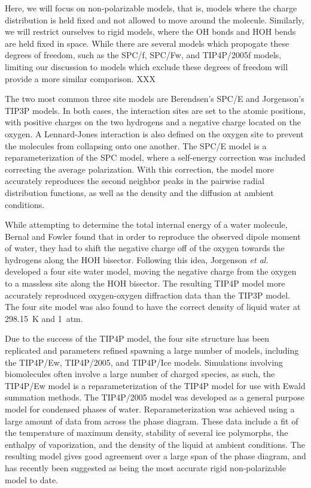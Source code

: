 Here, we will focus on non-polarizable models, that is, models where
the charge distribution is held fixed and not allowed to move around
the molecule. Similarly, we will restrict ourselves to rigid models,
where the OH bonds and HOH bends are held fixed in space. While there
are several models which propogate these degrees of freedom, such as
the SPC/f\cite{Ferguson1995}, SPC/Fw\cite{Wu2006}, and
TIP4P/2005f\cite{Gonzalez2011} models, limiting our discussion to
models which exclude these degrees of freedom will provide a more
similar comparison. XXX

The two most common three site models are Berendsen's
SPC/E\cite{Berendsen1987} and Jorgenson's TIP3P\cite{Jorgenson1983}
models. In both cases, the interaction sites are set to the atomic
positions, with positive charges on the two hydrogens and a negative
charge located on the oxygen. A Lennard-Jones interaction is also
defined on the oxygen site to prevent the molecules from collapsing
onto one another. The SPC/E model is a reparameterization of the
SPC\cite{Berendsen1981} model, where a self-energy correction was
included correcting the average polarization. With this correction,
the model more accurately reproduces the second neighbor peaks in the
pairwise radial distribution functions, as well as the density and the
diffusion at ambient conditions.\cite{Berendsen1987}

While attempting to determine the total internal energy of a water
molecule, Bernal and Fowler found that in order to reproduce the
observed dipole moment of water, they had to shift the negative charge
off of the oxygen towards the hydrogens along the HOH
bisector.\cite{Bernal1993} Following this idea, Jorgenson \textit{et
  al.} developed a four site water model, moving the negative charge
from the oxygen to a massless site along the HOH bisector. The
resulting TIP4P model more accurately reproduced oxygen-oxygen
diffraction data than the TIP3P model.\cite{Jorgenson1983} The four
site model was also found to have the correct density of liquid water
at 298.15~K and 1~atm. 

Due to the success of the TIP4P model, the four site structure has
been replicated and parameters refined spawning a large number of
models, including the TIP4P/Ew\cite{Horn2004},
TIP4P/2005\cite{Abascal2005a}, and TIP4P/Ice\cite{Abascal2005}
models. Simulations involving biomolecules often involve a large
number of charged species, as such, the TIP4P/Ew model is a
reparameterization of the TIP4P model for use with Ewald summation
methods. The TIP4P/2005 model was developed as a general purpose model
for condensed phases of water. Reparameterization was achieved using a
large amount of data from across the phase diagram. These data
include a fit of the temperature of maximum density, stability of
several ice polymorphs, the enthalpy of vaporization, and the density
of the liquid at ambient conditions. The resulting model gives good
agreement over a large span of the phase diagram, and has recently
been suggested as being the most accurate rigid non-polarizable model
to date.\cite{Vega2011a} 

